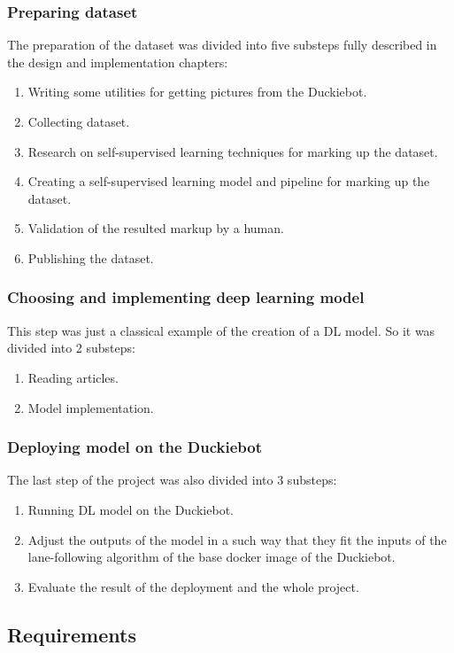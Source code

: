 \subsubsection{Preparing dataset}
The preparation of the dataset was divided into five substeps fully described in the design and implementation chapters:
\begin{enumerate}
    \item Writing some utilities for getting pictures from the Duckiebot.
    \item Collecting dataset.
    \item Research on self-supervised learning techniques for marking up the dataset.
    \item Creating a self-supervised learning model and pipeline for marking up the dataset.
    \item Validation of the resulted markup by a human.
    \item Publishing the dataset.
\end{enumerate} 
\subsubsection{Choosing and implementing deep learning model}
This step was just a classical example of the creation of a DL model. So it was divided into 2 substeps:
\begin{enumerate}
    \item Reading articles.
    \item Model implementation.
\end{enumerate}
\subsubsection{Deploying model on the Duckiebot}
The last step of the project was also divided into 3 substeps:
\begin{enumerate}
    \item Running DL model on the Duckiebot.
    \item Adjust the outputs of the model in a such way that they fit the inputs of the lane-following algorithm of the base docker image of the Duckiebot.
    \item Evaluate the result of the deployment and the whole project.
\end{enumerate}
\subsection{Requirements}
